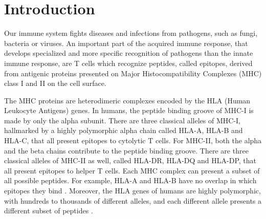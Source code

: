 \documentclass[utf8]{frontiersSCNS} %
\begin{document}
\section{Introduction}



Our immune system fights diseases and infections from pathogens, 
such as fungi, bacteria or viruses. 
An important part of the acquired immune response, 
that develops specialized and more specific recognition of pathogens 
than the innate immune response, 
are T cells which recognize peptides, called epitopes, derived from antigenic proteins presented on Major Histocompatibility Complexes (MHC) class I and II on the cell surface. 


The MHC proteins are heterodimeric complexes encoded by the
HLA (Human Leukocyte Antigens) genes.
In humans, the peptide binding groove of MHC-I is made by only the alpha subunit. There are three classical alleles of MHC-I, hallmarked by a highly polymorphic alpha chain called HLA-A, HLA-B and HLA-C, that all present epitopes to cytolytic T cells. 
For MHC-II, both the alpha and the beta chains contribute to the peptide binding groove. There are three classical alleles of MHC-II as well, called HLA-DR, HLA-DQ and HLA-DP, that all present epitopes to helper T cells.
Each MHC complex can present a subset of all possible peptides.
For example, HLA-A and HLA-B have no overlap in which
epitopes they bind \citep{lund2004definition}.
Moreover, the HLA genes of humans are highly polymorphic, with hundreds 
to thousands of different alleles, 
and each different allele presents a different subset of peptides \citep{marsh2010nomenclature}.
\end{document}
